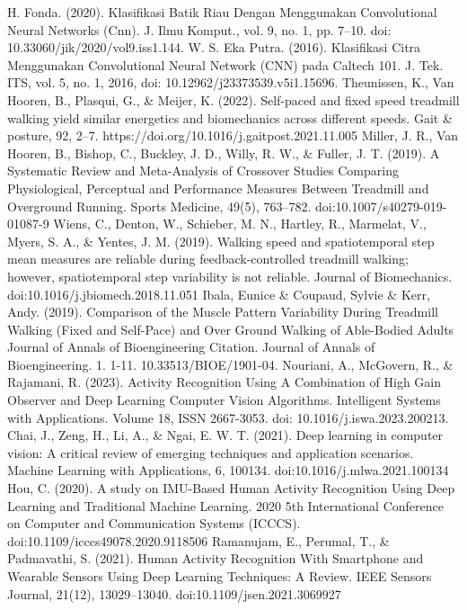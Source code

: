 \documentclass[12pt,twoside]{report}
\begin{document}
\begin{thebibliography}{}
    H. Fonda. (2020). Klasifikasi Batik Riau Dengan Menggunakan Convolutional Neural Networks (Cnn). J. Ilmu Komput., vol. 9, no. 1, pp. 7–10. doi: 10.33060/jik/2020/vol9.iss1.144.
    W. S. Eka Putra. (2016). Klasifikasi Citra Menggunakan Convolutional Neural Network (CNN) pada Caltech 101. J. Tek. ITS, vol. 5, no. 1, 2016, doi: 10.12962/j23373539.v5i1.15696.
    Theunissen, K., Van Hooren, B., Plasqui, G., \& Meijer, K. (2022). Self-paced and fixed speed treadmill walking yield similar energetics and biomechanics across different speeds. Gait \& posture, 92, 2–7. https://doi.org/10.1016/j.gaitpost.2021.11.005
    Miller, J. R., Van Hooren, B., Bishop, C., Buckley, J. D., Willy, R. W., \& Fuller, J. T. (2019). A Systematic Review and Meta-Analysis of Crossover Studies Comparing Physiological, Perceptual and Performance Measures Between Treadmill and Overground Running. Sports Medicine, 49(5), 763–782. doi:10.1007/s40279-019-01087-9 
    Wiens, C., Denton, W., Schieber, M. N., Hartley, R., Marmelat, V., Myers, S. A., \& Yentes, J. M. (2019). Walking speed and spatiotemporal step mean measures are reliable during feedback-controlled treadmill walking; however, spatiotemporal step variability is not reliable. Journal of Biomechanics. doi:10.1016/j.jbiomech.2018.11.051 
    Ibala, Eunice \& Coupaud, Sylvie \& Kerr, Andy. (2019). Comparison of the Muscle Pattern Variability During Treadmill Walking (Fixed and Self-Pace) and Over Ground Walking of Able-Bodied Adults Journal of Annals of Bioengineering Citation. Journal of Annals of Bioengineering. 1. 1-11. 10.33513/BIOE/1901-04. 
    Nouriani, A., McGovern, R., \& Rajamani, R. (2023). Activity Recognition Using A Combination of High Gain Observer and Deep Learning Computer Vision Algorithms. Intelligent Systems with Applications. Volume 18, ISSN 2667-3053. doi: 10.1016/j.iswa.2023.200213.
    Chai, J., Zeng, H., Li, A., \& Ngai, E. W. T. (2021). Deep learning in computer vision: A critical review of emerging techniques and application scenarios. Machine Learning with Applications, 6, 100134. doi:10.1016/j.mlwa.2021.100134 
    Hou, C. (2020). A study on IMU-Based Human Activity Recognition Using Deep Learning and Traditional Machine Learning. 2020 5th International Conference on Computer and Communication Systems (ICCCS). doi:10.1109/icccs49078.2020.9118506
    Ramanujam, E., Perumal, T., \& Padmavathi, S. (2021). Human Activity Recognition With Smartphone and Wearable Sensors Using Deep Learning Techniques: A Review. IEEE Sensors Journal, 21(12), 13029–13040. doi:10.1109/jsen.2021.3069927 

  \end{thebibliography}
\endgroup

\cleardoublepage


\cleardoublepage
\end{document}
